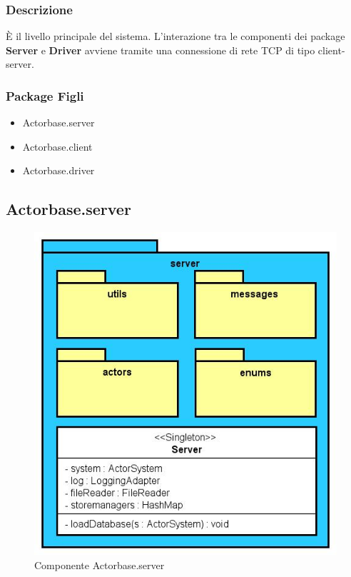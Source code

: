 \documentclass[a4paper]{article}
\begin{document}
			\subsubsection{Descrizione}
				È il livello principale del sistema. L'interazione tra le componenti dei package \textbf{Server} e \textbf{Driver} avviene tramite una 
				connessione di rete TCP di tipo client-server.
				
			\subsubsection{Package Figli}
				\begin{itemize}
					\item Actorbase.server
					\item Actorbase.client
					\item Actorbase.driver
				\end{itemize}
				
		\subsection{Actorbase.server}
		
			\begin{figure}[H]
				\centering
				\includegraphics[width=\textwidth]{ST/Server/serverLevel.jpg}
				\caption{Componente Actorbase.server}
			\end{figure}
\end{document}
